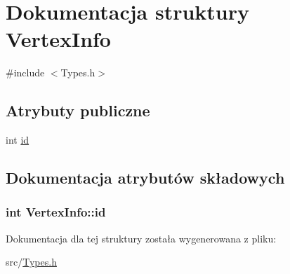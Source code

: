 \hypertarget{struct_vertex_info}{\section{Dokumentacja struktury Vertex\-Info}
\label{struct_vertex_info}
}


{\ttfamily \#include $<$Types.\-h$>$}

\subsection*{Atrybuty publiczne}
\begin{DoxyCompactItemize}
\item 
int \hyperlink{struct_vertex_info_a9592379da7b30ae95cdc1f587bccd420}{id}
\end{DoxyCompactItemize}


\subsection{Dokumentacja atrybutów składowych}
\hypertarget{struct_vertex_info_a9592379da7b30ae95cdc1f587bccd420}{
\subsubsection[{id}]{\setlength{\rightskip}{0pt plus 5cm}int Vertex\-Info\-::id}}\label{struct_vertex_info_a9592379da7b30ae95cdc1f587bccd420}


Dokumentacja dla tej struktury została wygenerowana z pliku\-:\begin{DoxyCompactItemize}
\item 
src/\hyperlink{_types_8h}{Types.\-h}\end{DoxyCompactItemize}
